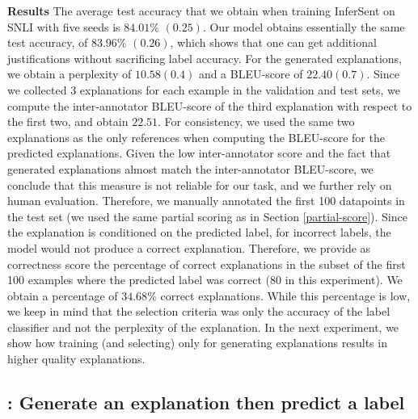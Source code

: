\textbf{Results   }
The average test accuracy that we obtain when training InferSent\cite{infersent} on SNLI with five seeds is $84.01\%$  $(0.25)$. Our \eInferSent{} model obtains essentially the same test accuracy, of $83.96\%$ $(0.26)$, which shows that one can get additional justifications without sacrificing label accuracy. For the generated explanations, we obtain a perplexity of $10.58 (0.4)$ and a BLEU-score of $22.40 (0.7)$. Since we collected 3 explanations for each example in the validation and test sets, we compute the inter-annotator BLEU-score of the third explanation with respect to the first two, and obtain $22.51$. For consistency, we used the same two explanations as the only references when computing the BLEU-score for the predicted explanations. Given the low inter-annotator score and the fact that generated explanations almost match the inter-annotator BLEU-score, we conclude that this measure is not reliable for our task, and we further rely on human evaluation. Therefore, we manually annotated the first 100 datapoints in the test set (we used the same partial scoring as in Section \ref{partial-score}). Since the explanation is conditioned on the predicted label, for incorrect labels, the model would not produce a correct explanation. Therefore, we provide as correctness score the percentage of correct explanations in the subset of the first 100 examples where the predicted label was correct (80 in this experiment). We obtain a percentage of $34.68\%$ correct explanations. While this percentage is low, we keep in mind that the selection criteria was only the accuracy of the label classifier and not the perplexity of the explanation. In the next experiment, we show how training (and selecting) only for generating explanations results in higher quality explanations.

\subsection{\exptwo{}: Generate an explanation then predict a label}

